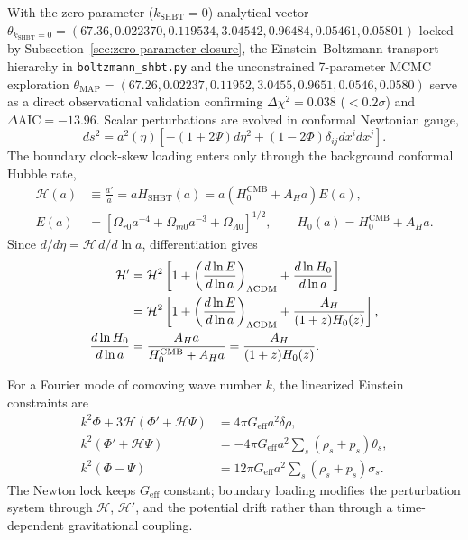\documentclass[11pt,letterpaper]{article}
\theoremstyle{plain}
\DeclareRobustCommand{\pyvar}[1]{%
  \ifmmode\text{\nolinkurl{#1}}\else\nolinkurl{#1}\fi%
}
\newcommand{\lcdm}{\ensuremath{\Lambda\mathrm{CDM}}}
\newcommand{\hcmb}{H_0^{\text{CMB}}}
\newcommand{\AH}{A_H}
\begin{document}
With the zero-parameter ($k_{\text{SHBT}} = 0$) analytical vector $\theta_{k_{\text{SHBT}}=0} = (67.36, 0.022370, 0.119534, 3.04542, 0.96484, 0.05461, 0.05801)$ locked by Subsection~\ref{sec:zero-parameter-closure}, the Einstein--Boltzmann transport hierarchy in \pyvar{boltzmann_shbt.py} and the unconstrained 7-parameter MCMC exploration $\theta_{\text{MAP}} = (67.26, 0.02237, 0.11952, 3.0455, 0.9651, 0.0546, 0.0580)$ serve as a direct observational validation confirming $\Delta\chi^2 = 0.038$ ($< 0.2\sigma$) and $\Delta\text{AIC} = -13.96$.
Scalar perturbations are evolved in conformal Newtonian gauge,
\begin{equation}
\label{eq:shbt-newtonian-gauge-metric}
 ds^2
 =
 a^2(\eta)
 \left[
 -(1+2\Psi)d\eta^2
 +(1-2\Phi)\delta_{ij}dx^i dx^j
 \right].
\end{equation}
The boundary clock-skew loading enters only through the background conformal
Hubble rate,
\begin{align}
\label{eq:shbt-conformal-hubble}
 \mathcal H(a)
 &\equiv
 \frac{a'}{a}
 =
 aH_{\text{SHBT}}(a)
 =
 a\left(\hcmb+\AH a\right)E(a),
 \\
\label{eq:shbt-background-ea}
 E(a)
 &=
 \left[
 \Omega_{r0}a^{-4}
 +\Omega_{m0}a^{-3}
 +\Omega_{\Lambda0}
 \right]^{1/2},
 \qquad
 H_0(a)=\hcmb+\AH a.
\end{align}
Since \(d/d\eta=\mathcal H\,d/d\ln a\), differentiation gives
\begin{align}
\label{eq:shbt-conformal-acceleration}
 \mathcal H'
 &=
 \mathcal H^2
 \left[
 1+
 \left(\frac{d\ln E}{d\ln a}\right)_{\lcdm}
 +
 \frac{d\ln H_0}{d\ln a}
 \right]
 \notag\\
 &=
 \mathcal H^2
 \left[
 1+
 \left(\frac{d\ln E}{d\ln a}\right)_{\lcdm}
 +
 \frac{\AH}{(1+z)H_0(z)}
 \right],
 \\
\label{eq:shbt-log-h0-drift}
 \frac{d\ln H_0}{d\ln a}
 &=
 \frac{\AH a}{\hcmb+\AH a}
 =
 \frac{\AH}{(1+z)H_0(z)}.
\end{align}

For a Fourier mode of comoving wave number \(k\), the linearized Einstein
constraints are
\begin{align}
\label{eq:shbt-einstein-energy-constraint}
 k^2\Phi
 +3\mathcal H\left(\Phi'+\mathcal H\Psi\right)
 &=
 4\pi G_{\text{eff}}a^2\delta\rho,
 \\
\label{eq:shbt-einstein-momentum-constraint}
 k^2\left(\Phi'+\mathcal H\Psi\right)
 &=
 -4\pi G_{\text{eff}}a^2
 \sum_s(\rho_s+p_s)\theta_s,
 \\
\label{eq:shbt-einstein-shear-constraint}
 k^2(\Phi-\Psi)
 &=
 12\pi G_{\text{eff}}a^2
 \sum_s(\rho_s+p_s)\sigma_s.
\end{align}
The Newton lock keeps \(G_{\text{eff}}\) constant; boundary loading modifies
the perturbation system through \(\mathcal H\), \(\mathcal H'\), and the
potential drift rather than through a time-dependent gravitational coupling.
\end{document}
